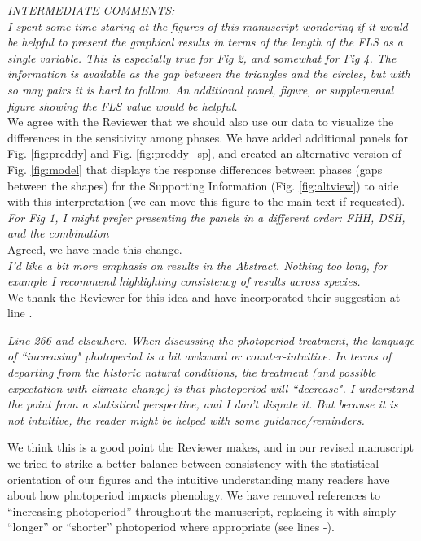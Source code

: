 \documentclass[11pt]{article}
\begin{document}
\emph{INTERMEDIATE COMMENTS:}\\
\emph{I spent some time staring at the figures of this manuscript wondering if it would be helpful to present the graphical results in terms of the length of the FLS as a single variable. This is especially true for Fig 2, and somewhat for Fig 4. The information is available as the gap between the triangles and the circles, but with so may pairs it is hard to follow. An additional panel, figure, or supplemental figure showing the FLS value would be helpful.}\\

\noindent We agree with the Reviewer that we should also use our data to visualize the differences in the sensitivity among phases. We have added additional panels for Fig. \ref{fig:preddy} and Fig. \ref{fig:preddy_sp}, and created an alternative version of Fig. \ref{fig:model} that displays the response differences between phases (gaps between the shapes) for the Supporting Information (Fig. \ref{fig:altview}) to aide with this interpretation (we can move this figure to the main text if requested). \\ 

\emph{For Fig 1, I might prefer presenting the panels in a different order: FHH, DSH, and the combination}\\

\noindent Agreed, we have made this change.\\

\emph{I’d like a bit more emphasis on results in the Abstract. Nothing too long, for example I recommend highlighting consistency of results across species.}\\

\noindnet We thank the Reviewer for this idea and have incorporated their suggestion at line .

\emph{Line 266 and elsewhere. When discussing the photoperiod treatment, the language of ``increasing" photoperiod is a bit awkward or counter-intuitive. In terms of departing from the historic natural conditions, the treatment (and possible expectation with climate change) is that photoperiod will ``decrease". I understand the point from a statistical perspective, and I don’t dispute it. But because it is not intuitive, the reader might be helped with some guidance/reminders.}

\noindent We think this is a good point the Reviewer makes, and in our revised manuscript we tried to strike a better balance between consistency with the statistical orientation of our figures and the intuitive understanding many readers have about how photoperiod impacts phenology. We have removed references to ``increasing photoperiod'' throughout the manuscript, replacing it with simply ``longer'' or ``shorter'' photoperiod where appropriate (see lines -).\\
\end{document}
